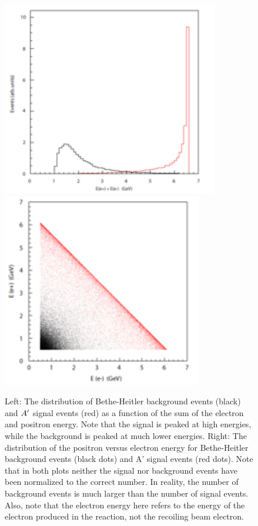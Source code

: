 \begin{figure}
\includegraphics[scale=1]{measurements/rad-bh-energy.pdf}
\includegraphics[scale=1]{measurements/E1vsE2.pdf}
\caption{ Left: The distribution of Bethe-Heitler background events (black) and $A^\prime$ signal events (red) as a function of the sum of the electron and positron energy. Note that the signal is peaked at high energies, while the background is peaked at much lower energies. Right: The distribution of the positron versus electron energy for Bethe-Heitler background events (black dots) and A’ signal events (red dots). Note that in both plots neither the signal nor background events have been normalized to the correct number. In reality, the number of background events is much larger than the number of signal events. Also, note that the electron energy here refers to the energy of the electron produced in the reaction, not the recoiling beam electron.}
\label{fig:tridentkinematics}
\end{figure}


